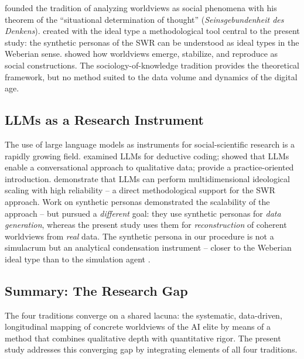 \documentclass[12pt,a4paper]{article}
\begin{document}
\citet{Mannheim1929} founded the tradition of analyzing worldviews as social phenomena with his theorem of the ``situational determination of thought'' (\emph{Seinsgebundenheit des Denkens}). \citet{Weber1904} created with the ideal type a methodological tool central to the present study: the synthetic personas of the SWR can be understood as ideal types in the Weberian sense. \citet{BergerLuckmann1966} showed how worldviews emerge, stabilize, and reproduce as social constructions. The sociology-of-knowledge tradition provides the theoretical framework, but no method suited to the data volume and dynamics of the digital age.


\subsection{LLMs as a Research Instrument}
\label{sec:forschungsstand:llm}

The use of large language models as instruments for social-scientific research is a rapidly growing field. \citet{Tai2024} examined LLMs for deductive coding; \citet{Hayes2025} showed that LLMs enable a conversational approach to qualitative data; \citet{NicmanisSpurrier2025} provide a practice-oriented introduction. \citet{OrnsteinEtAl2025} demonstrate that LLMs can perform multidimensional ideological scaling with high reliability -- a direct methodological support for the SWR approach. Work on synthetic personas \citep{Ge2024} demonstrated the scalability of the approach -- but pursued a \emph{different} goal: they use synthetic personas for \emph{data generation}, whereas the present study uses them for \emph{reconstruction} of coherent worldviews from \emph{real} data. The synthetic persona in our procedure is not a simulacrum but an analytical condensation instrument -- closer to the Weberian ideal type than to the simulation agent \citep[cf.][]{Booth1961, NgRussell2000, JaraEttinger2019}.


\subsection{Summary: The Research Gap}
\label{sec:forschungsstand:luecke}

The four traditions converge on a shared lacuna: the systematic, data-driven, longitudinal mapping of concrete worldviews of the AI elite by means of a method that combines qualitative depth with quantitative rigor. The present study addresses this converging gap by integrating elements of all four traditions.
\end{document}
